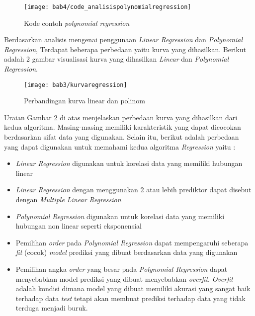 \begin{figure}[H]
	\centering  
	\texttt{[image: bab4/code\_analisispolynomialregression]}   
	\caption{Kode contoh \textit{polynomial regression}}
	\label{fig:code_analisispolynomialregression} 
\end{figure} 

 

%
%
%
%
%

Berdasarkan analisis mengenai penggunaan \textit{Linear Regression} dan \textit{Polynomial Regression}, Terdapat beberapa perbedaan yaitu kurva yang dihasilkan. Berikut adalah 2 gambar visualisasi kurva yang dihasilkan \textit{Linear} dan \textit{Polynomial Regression}.
\begin{figure}[H]
	\centering  
	\texttt{[image: bab3/kurvaregression]}   
	\caption{Perbandingan kurva linear dan polinom}
	\label{fig:kurvaregression} 
\end{figure} 

Uraian Gambar \ref{fig:kurvaregression} di atas menjelaskan perbedaan kurva yang dihasilkan dari kedua algoritma. Masing-masing memiliki karakteristik yang dapat dicocokan berdasarkan sifat data yang digunakan. Selain itu, berikut adalah perbedaan yang dapat digunakan untuk memahami kedua algoritma \textit{Regression} yaitu : 

\begin{itemize}
\item \textit{Linear Regression} digunakan untuk korelasi data yang memiliki hubungan linear 
\item \textit{Linear Regression} dengan menggunakan 2 atau lebih prediktor dapat disebut dengan \textit{Multiple Linear Regression}
\item \textit{Polynomial Regression} digunakan untuk korelasi data yang memiliki hubungan non linear seperti eksponensial 
\item Pemilihan \textit{order} pada \textit{Polynomial Regression} dapat mempengaruhi seberapa \textit{fit} (cocok) \textit{model} prediksi yang dibuat berdasarkan data yang digunakan 
\item Pemilihan angka \textit{order} yang besar pada \textit{Polynomial Regression} dapat menyebabkan model prediksi yang dibuat menyebabkan \textit{overfit}. \textit{Overfit} adalah kondisi dimana model yang dibuat memiliki akurasi yang sangat baik terhadap data \textit{test} tetapi akan membuat prediksi terhadap data yang tidak terduga menjadi buruk. 
\end{itemize}

